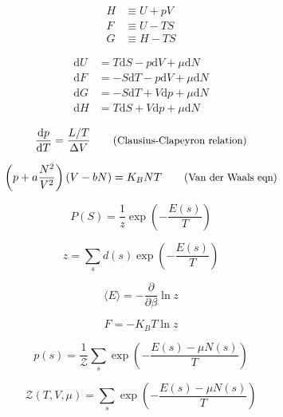 \begin{align*}
    H &\equiv  U + pV \\
    F &\equiv U - TS \\
    G &\equiv H - TS
\end{align*}

\begin{figure}
    \centering
\end{figure}

\begin{align}
    \mathrm{d}U &= T\mathrm{d}S - p\mathrm{d}V + \mu \mathrm{d}N \\
    \mathrm{d}F &= -S\mathrm{d}T - p\mathrm{d}V + \mu \mathrm{d}N \\
    \mathrm{d}G &= -S\mathrm{d}T + V\mathrm{d}p + \mu \mathrm{d}N \\
    \mathrm{d}H &= T\mathrm{d}S + V\mathrm{d}p + \mu \mathrm{d}N
\end{align}



\begin{equation*}
    \d{p}{T} = \frac{L/T}{\Delta V} \comment{Clausius-Clapeyron relation}
\end{equation*}

\begin{equation*}
    \left(p + a\frac{N^2}{V^{2}}\right) \left(V - bN\right) = K_{B}NT \comment{Van der Waals eqn}
\end{equation*}

\begin{equation*}
    P(S) = \frac{1}{z} \exp \left(- \frac{E(s)}{T} \right)
\end{equation*}

\begin{equation*}
    z = \sum_{s} d(s) \exp \left(- \frac{E(s)}{T} \right)
\end{equation*}

\begin{equation*}
    \langle E \rangle = -\frac{\partial}{\partial \beta} \ln z
\end{equation*}

\begin{equation*}
    F = - K_{B} T \ln z
\end{equation*}

\begin{equation*}
    p(s) = \frac{1}{\mathcal{Z}} \sum_{s} \exp \left(- \frac{E(s) - \mu N(s)}{T} \right)\end{equation*}

\begin{equation*}
    \mathcal{Z}(T,V,\mu) = \sum_{s} \exp \left(- \frac{E(s) - \mu N(s)}{T} \right)
\end{equation*}
